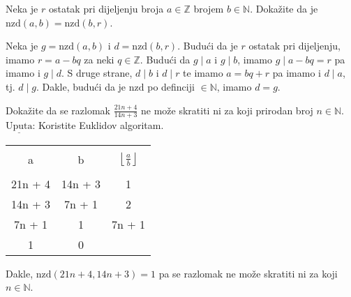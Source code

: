\documentclass{exam}
\begin{document}
\begin{questions}
\begin{solution}
\end{solution}

\pagebreak

\question Neka je $r$ ostatak pri dijeljenju broja $a \in \mathbb{Z}$ brojem $b \in \mathbb{N}$. Dokažite da je $\text{nzd}(a, b) = \text{nzd}(b, r)$.

\begin{solution}
  Neka je $g = \text{nzd}(a, b)$ i $d = \text{nzd}(b, r)$. Budući da je $r$ ostatak pri dijeljenju, imamo $r = a - bq$ za neki $q \in \mathbb{Z}$. Budući da $g \mid a$ i $g \mid b$, imamo $g \mid a - bq = r$ pa imamo i $g \mid d$. S druge strane, $d \mid b$ i $d \mid r$ te imamo $a = bq + r$ pa imamo i $d \mid a$, tj. $d \mid g$. Dakle, budući da je $\text{nzd}$ po definciji $\in \mathbb{N}$, imamo $d = g$.
\end{solution}

\question Dokažite da se razlomak $\displaystyle \frac{21n + 4}{14n + 3}$ ne može skratiti ni za koji prirodan broj $n \in \mathbb{N}$. \newline
$\underline{\text{Uputa}}$: Koristite Euklidov algoritam.

\renewcommand{\solutiontitle}{\noindent\textbf{1. Rj:}\enspace}

\begin{solution}
  \begin{tabular}{|c|c|c|}
    \hline
    & &\\[-1em]
    a & b & $\left\lfloor \frac{a}{b} \right\rfloor$\\
    & &\\[-1em]
    \hline
    21n + 4 & 14n + 3 & 1\\
    14n + 3 & 7n + 1 & 2\\
    7n + 1 & 1 & 7n + 1\\
    1 & 0 &\\
    \hline
  \end{tabular}
  \vspace*{0.25cm}
  \newline
  Dakle, $\text{nzd}(21n + 4, 14n + 3) = 1$ pa se razlomak ne može skratiti ni za koji $n \in \mathbb{N}$.
\end{solution}


\end{questions}
\end{document}

